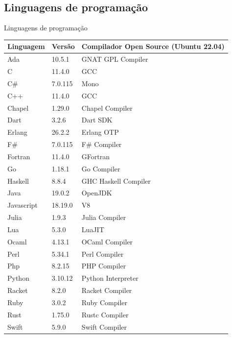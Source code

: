 \subsection{Linguagens de programação}
\begin{frame}{Linguagens de programação}
    \begin{table}[h]
        \centering
        \fontsize{6}{7}\selectfont
        \begin{tabular}{l|l|l}
            \textbf{Linguagem} & \textbf{Versão} & \textbf{Compilador Open Source (Ubuntu 22.04)}\\
            \hline
            Ada & 10.5.1 & GNAT GPL Compiler \\
            \hline
            C & 11.4.0 & GCC \\
            \hline
            C\# & 7.0.115 & Mono \\
            \hline
            C++ & 11.4.0 & GCC \\
            \hline
            Chapel & 1.29.0 & Chapel Compiler \\
            \hline
            Dart & 3.2.6 & Dart SDK \\
            \hline
            Erlang &  26.2.2 & Erlang OTP \\
            \hline
            F\# & 7.0.115 & F\# Compiler \\
            \hline
            Fortran & 11.4.0 & GFortran \\
            \hline
            Go & 1.18.1 & Go Compiler \\
            \hline
            Haskell & 8.8.4 & GHC Haskell Compiler \\
            \hline
            Java & 19.0.2 & OpenJDK \\
            \hline
            Javascript & 18.19.0 & V8 \\
            \hline
            Julia & 1.9.3 & Julia Compiler \\
            \hline
            Lua & 5.3.0 & LuaJIT \\
            \hline
            Ocaml & 4.13.1 & OCaml Compiler \\
            \hline
            Perl & 5.34.1 & Perl Compiler \\
            \hline
            Php & 8.2.15 & PHP Compiler \\
            \hline
            Python & 3.10.12 & Python Interpreter \\
            \hline
            Racket & 8.2.0 & Racket Compiler \\
            \hline
            Ruby & 3.0.2 & Ruby Compiler \\
            \hline
            Rust & 1.75.0 & Rustc Compiler \\
            \hline
            Swift & 5.9.0 & Swift Compiler \\
        \end{tabular}
    \end{table}
\end{frame}

